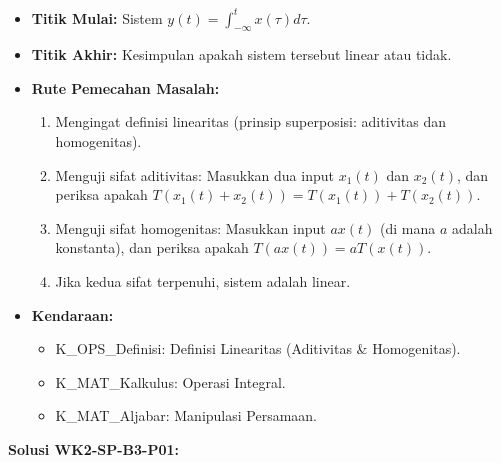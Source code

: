 \documentclass[
  letterpaper,
  DIV=11,
  numbers=noendperiod]{scrreprt}
\providecommand{\tightlist}{%
  \setlength{\itemsep}{0pt}\setlength{\parskip}{0pt}}
\begin{document}
\begin{itemize}
\tightlist
\item
  \textbf{Titik Mulai:} Sistem
  \(y(t) = \int_{-\infty}^{t} x(\tau) d\tau\).
\item
  \textbf{Titik Akhir:} Kesimpulan apakah sistem tersebut linear atau
  tidak.
\item
  \textbf{Rute Pemecahan Masalah:}

  \begin{enumerate}
  \def\labelenumi{\arabic{enumi}.}
  \tightlist
  \item
    Mengingat definisi linearitas (prinsip superposisi: aditivitas dan
    homogenitas).
  \item
    Menguji sifat aditivitas: Masukkan dua input \(x_1(t)\) dan
    \(x_2(t)\), dan periksa apakah
    \(T(x_1(t)+x_2(t)) = T(x_1(t)) + T(x_2(t))\).
  \item
    Menguji sifat homogenitas: Masukkan input \(ax(t)\) (di mana \(a\)
    adalah konstanta), dan periksa apakah \(T(ax(t)) = aT(x(t))\).
  \item
    Jika kedua sifat terpenuhi, sistem adalah linear.
  \end{enumerate}
\item
  \textbf{Kendaraan:}

  \begin{itemize}
  \tightlist
  \item
    K\_OPS\_Definisi: Definisi Linearitas (Aditivitas \& Homogenitas).
  \item
    K\_MAT\_Kalkulus: Operasi Integral.
  \item
    K\_MAT\_Aljabar: Manipulasi Persamaan.
  \end{itemize}
\end{itemize}

\textbf{Solusi WK2-SP-B3-P01:}
\end{document}
